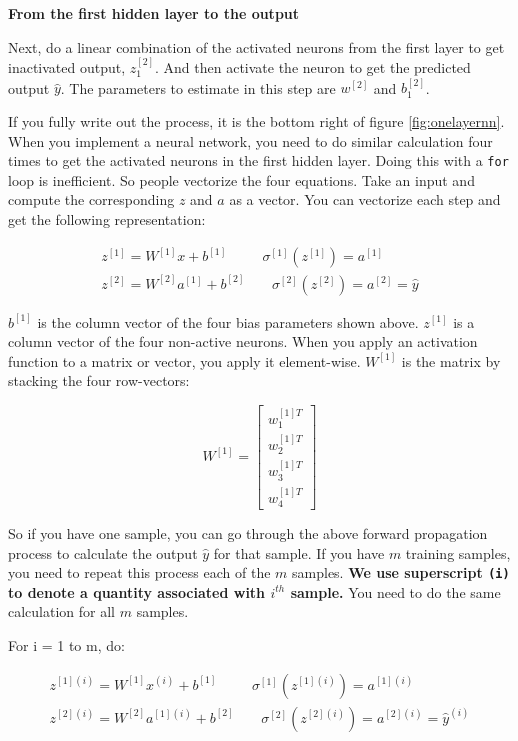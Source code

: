 \documentclass[
  12pt,
]{krantz}
\begin{document}
\textbf{From the first hidden layer to the output}

Next, do a linear combination of the activated neurons from the first layer to get inactivated output, \(z^{[2]}_1\). And then activate the neuron to get the predicted output \(\hat{y}\). The parameters to estimate in this step are \(w^{[2]}\) and \(b_1^{[2]}\).

If you fully write out the process, it is the bottom right of figure \ref{fig:onelayernn}. When you implement a neural network, you need to do similar calculation four times to get the activated neurons in the first hidden layer. Doing this with a \texttt{for} loop is inefficient. So people vectorize the four equations. Take an input and compute the corresponding \(z\) and \(a\) as a vector. You can vectorize each step and get the following representation:

\[\begin{array}{cc}
z^{[1]}=W^{[1]}x+b^{[1]} & \ \ \sigma^{[1]}(z^{[1]})=a^{[1]}\\
z^{[2]}=W^{[2]}a^{[1]}+b^{[2]} & \ \ \ \ \ \sigma^{[2]}(z^{[2]})=a^{[2]}=\hat{y}
\end{array}\]

\(b^{[1]}\) is the column vector of the four bias parameters shown above. \(z^{[1]}\) is a column vector of the four non-active neurons. When you apply an activation function to a matrix or vector, you apply it element-wise. \(W^{[1]}\) is the matrix by stacking the four row-vectors:

\[W^{[1]}=\left[\begin{array}{c}
w_{1}^{[1]T}\\
w_{2}^{[1]T}\\
w_{3}^{[1]T}\\
w_{4}^{[1]T}
\end{array}\right]\]

So if you have one sample, you can go through the above forward propagation process to calculate the output \(\hat{y}\) for that sample. If you have \(m\) training samples, you need to repeat this process each of the \(m\) samples. \textbf{We use superscript \texttt{(i)} to denote a quantity associated with \(i^{th}\) sample.} You need to do the same calculation for all \(m\) samples.

For i = 1 to m, do:

\[\begin{array}{cc}
z^{[1](i)}=W^{[1]}x^{(i)}+b^{[1]} & \ \ \sigma^{[1]}(z^{[1](i)})=a^{[1](i)}\\
z^{[2](i)}=W^{[2]}a^{[1](i)}+b^{[2]} & \ \ \ \ \ \sigma^{[2]}(z^{[2](i)})=a^{[2](i)}=\hat{y}^{(i)}
\end{array}\]
\end{document}

